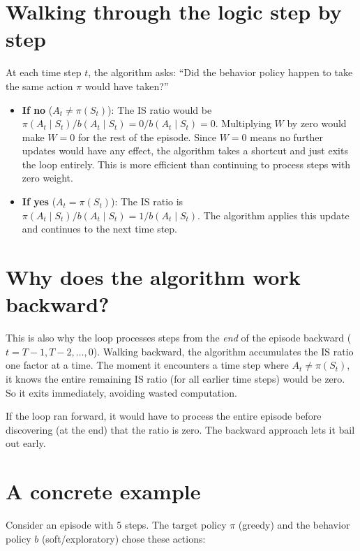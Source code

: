 \documentclass[11pt]{article}
\begin{document}
\section*{Walking through the logic step by step}

At each time step $t$, the algorithm asks: ``Did the behavior policy happen to take the same action $\pi$ would have taken?''

\begin{itemize}[nosep]
    \item \textbf{If no} ($A_t \neq \pi(S_t)$): The IS ratio would be $\pi(A_t \mid S_t) / b(A_t \mid S_t) = 0 / b(A_t \mid S_t) = 0$. Multiplying $W$ by zero would make $W = 0$ for the rest of the episode. Since $W = 0$ means no further updates would have any effect, the algorithm takes a shortcut and just exits the loop entirely. This is more efficient than continuing to process steps with zero weight.

    \item \textbf{If yes} ($A_t = \pi(S_t)$): The IS ratio is $\pi(A_t \mid S_t) / b(A_t \mid S_t) = 1 / b(A_t \mid S_t)$. The algorithm applies this update and continues to the next time step.
\end{itemize}

\section*{Why does the algorithm work backward?}

This is also why the loop processes steps from the \textit{end} of the episode backward ($t = T{-}1, T{-}2, \ldots, 0$). Walking backward, the algorithm accumulates the IS ratio one factor at a time. The moment it encounters a time step where $A_t \neq \pi(S_t)$, it knows the entire remaining IS ratio (for all earlier time steps) would be zero. So it exits immediately, avoiding wasted computation.

If the loop ran forward, it would have to process the entire episode before discovering (at the end) that the ratio is zero. The backward approach lets it bail out early.

\section*{A concrete example}

Consider an episode with 5 steps. The target policy $\pi$ (greedy) and the behavior policy $b$ (soft/exploratory) chose these actions:
\end{document}
